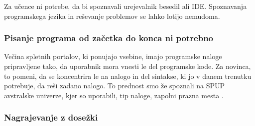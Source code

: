 Za učence ni potrebe, da bi spoznavali urejevalnik besedil ali
IDE. Spoznavanja programskega jezika in reševanje problemov se lahko
lotijo nemudoma.


\subsubsection{Pisanje programa od začetka do konca ni potrebno}
\label{sec:pisanj_celega_progama}

Večina spletnih portalov, ki ponujajo vsebine, imajo programske naloge
pripravljene tako, da uporabnik mora vnesti le del programske kode. Za
novinca, to pomeni, da se koncentrira le na nalogo in del sintakse, ki
jo v danem trenutku potrebuje, da reši zadano nalogo. To prednost smo
že spoznali na SPUP avstralske univerze, kjer so uporabili, tip
naloge, zapolni prazna mesta \cite{thesisAWebP}.

\subsubsection{Nagrajevanje z dosežki}
\label{sec:nagrajevanje_s_dosežkov}
